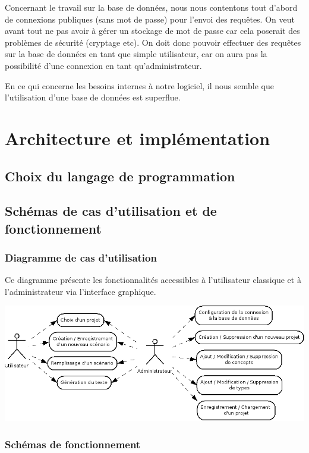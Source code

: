 \documentclass[12pt]{report}
\begin{document}
Concernant le travail sur la base de données, nous nous contentons tout
d'abord de connexions publiques (sans mot de passe) pour l'envoi des
requêtes. On veut avant tout ne pas avoir à gérer un stockage de mot de
passe car cela poserait des problèmes de sécurité (cryptage etc).
On doit donc pouvoir effectuer des requêtes sur la base de données en
tant que simple utilisateur, car on aura pas la possibilité d'une
connexion en tant qu'administrateur.

En ce qui concerne les besoins internes à notre logiciel, il nous semble
que l'utilisation d'une base de données est superflue.  


\chapter{Architecture et implémentation}

\section{Choix du langage de programmation}

\section{Schémas de cas d'utilisation et de fonctionnement}




\subsection{Diagramme de cas d'utilisation}

	Ce diagramme présente les fonctionnalités accessibles à l'utilisateur classique et à l'administrateur via l'interface graphique. \bigskip

	\includegraphics[scale=0.5]{cas_utilisation.png}

\subsection{Schémas de fonctionnement}
\end{document}
